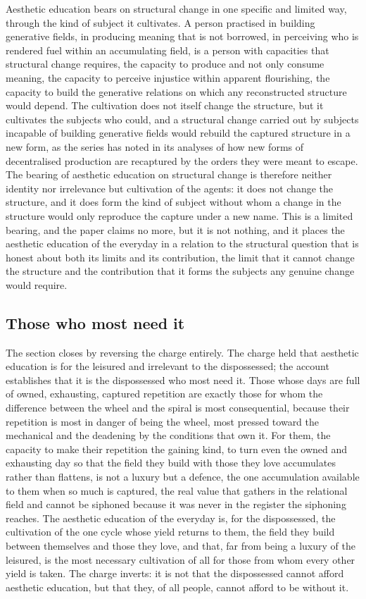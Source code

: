 Aesthetic education bears on structural change in one specific and limited way, through the kind of subject it cultivates. A person practised in building generative fields, in producing meaning that is not borrowed, in perceiving who is rendered fuel within an accumulating field, is a person with capacities that structural change requires, the capacity to produce and not only consume meaning, the capacity to perceive injustice within apparent flourishing, the capacity to build the generative relations on which any reconstructed structure would depend. The cultivation does not itself change the structure, but it cultivates the subjects who could, and a structural change carried out by subjects incapable of building generative fields would rebuild the captured structure in a new form, as the series has noted in its analyses of how new forms of decentralised production are recaptured by the orders they were meant to escape. The bearing of aesthetic education on structural change is therefore neither identity nor irrelevance but cultivation of the agents: it does not change the structure, and it does form the kind of subject without whom a change in the structure would only reproduce the capture under a new name. This is a limited bearing, and the paper claims no more, but it is not nothing, and it places the aesthetic education of the everyday in a relation to the structural question that is honest about both its limits and its contribution, the limit that it cannot change the structure and the contribution that it forms the subjects any genuine change would require.

\subsection{Those who most need it}
\label{p22:sub:pe-who-needs}

The section closes by reversing the charge entirely. The charge held that aesthetic education is for the leisured and irrelevant to the dispossessed; the account establishes that it is the dispossessed who most need it. Those whose days are full of owned, exhausting, captured repetition are exactly those for whom the difference between the wheel and the spiral is most consequential, because their repetition is most in danger of being the wheel, most pressed toward the mechanical and the deadening by the conditions that own it. For them, the capacity to make their repetition the gaining kind, to turn even the owned and exhausting day so that the field they build with those they love accumulates rather than flattens, is not a luxury but a defence, the one accumulation available to them when so much is captured, the real value that gathers in the relational field and cannot be siphoned because it was never in the register the siphoning reaches. The aesthetic education of the everyday is, for the dispossessed, the cultivation of the one cycle whose yield returns to them, the field they build between themselves and those they love, and that, far from being a luxury of the leisured, is the most necessary cultivation of all for those from whom every other yield is taken. The charge inverts: it is not that the dispossessed cannot afford aesthetic education, but that they, of all people, cannot afford to be without it.
